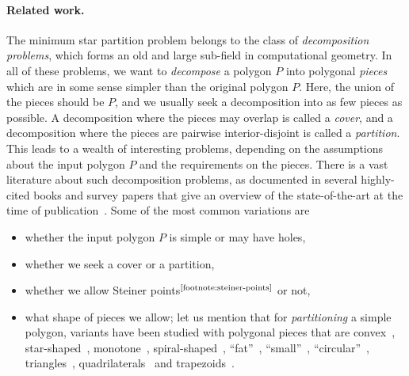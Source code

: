 \documentclass[10pt,a4paper]{article}
\begin{document}
\paragraph{Related work.}
The minimum star partition problem belongs to the class of \emph{decomposition problems}, which forms an old and large sub-field in computational geometry.
In all of these problems, we want to \emph{decompose} a polygon $P$ into polygonal \emph{pieces} which are in some sense simpler than the original polygon $P$.
Here, the union of the pieces should be $P$, and we usually seek a decomposition into as few pieces as possible.
A decomposition where the pieces may overlap is called a \emph{cover}, and a decomposition where the pieces are pairwise interior-disjoint is called a \emph{partition}.
This leads to a wealth of interesting problems,
depending on the assumptions about the input polygon $P$ and the requirements on the pieces.
There is a vast literature about such decomposition problems, as documented in several highly-cited books and survey papers that give an overview of the state-of-the-art at the time of publication~\cite{keil1985minimum,chazelle1985approximation,o1987art,DBLP:journals/pieee/Shermer92,chazelle1994decomposition,keil1999polygon,o2004polygons}.
Some of the most common variations are
\begin{itemize}[noitemsep,topsep=0pt,parsep=0pt,partopsep=0pt]
\item whether the input polygon $P$ is simple or may have holes, 
\item whether we seek a cover or a partition,
\item whether we allow Steiner points${}^\text{\ref{footnote:steiner-points}}$ or not,
\item what shape of pieces we allow; let us mention that for \emph{partitioning} a simple polygon, variants have been studied with polygonal pieces that are convex~\cite{DBLP:journals/tc/FengP75,DBLP:journals/tc/Schachter78,chazelle1985optimal,DBLP:journals/siamcomp/Keil85,DBLP:conf/focs/Chazelle82,DBLP:journals/iandc/HertelM85,DBLP:journals/ijcga/KeilS02}, star-shaped~\cite{DBLP:journals/tc/FengP75,DBLP:journals/siamcomp/Keil85,DBLP:journals/algorithmica/LiuN91}, monotone~\cite{DBLP:journals/ipl/GareyJPT78,DBLP:journals/ipl/LiuN88}, spiral-shaped~\cite{DBLP:journals/siamcomp/Keil85}, ``fat''~\cite{DBLP:journals/comgeo/Kreveld98,DBLP:journals/comgeo/Damian04,DBLP:conf/cccg/BuchinS21}, ``small''~\cite{DBLP:conf/esa/ArkinD0GMPT20,damian2004computing}, ``circular''~\cite{DBLP:conf/cccg/Damian-IordacheO03}, triangles~\cite{DBLP:journals/jal/AsanoAP86,DBLP:journals/dcg/Chazelle91}, quadrilaterals~\cite{DBLP:conf/compgeom/Lubiw85,DBLP:conf/compgeom/Muller-HannemannW97} and trapezoids~\cite{DBLP:journals/jacm/AsanoAI86}.
\end{itemize}
\end{document}

